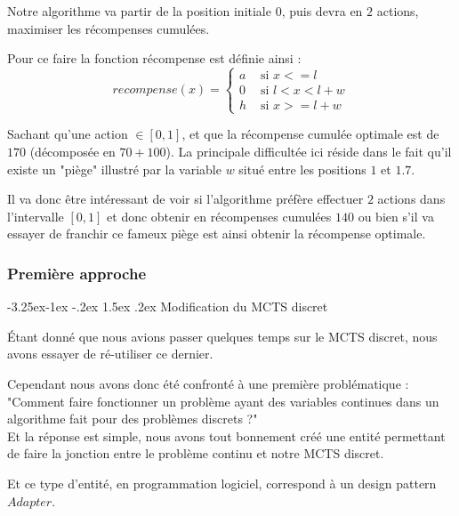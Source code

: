 \documentclass[pdftex,french, english]{article}	%
\makeatletter
\newcounter {subsubsubsection}[subsubsection]
\newcommand\subsubsubsection{\@startsection{subsubsubsection}{4}{\z@}%
                                     {-3.25ex\@plus -1ex \@minus -.2ex}%
                                     {1.5ex \@plus .2ex}%
                                     {\normalfont\normalsize\bfseries}}
\makeatother
\begin{document}
	Notre algorithme va partir de la position initiale $0$, puis devra en $2$ actions, maximiser les récompenses cumulées.

	Pour ce faire la fonction récompense est définie ainsi :
	$$recompense(x) = \left\{
	\begin{array}{ll}
 	a & \mbox{ si $x <= l$}\\
 	0 & \mbox{ si $l < x < l + w$}\\
 	h & \mbox{ si $x >= l + w$}
 	\end{array}\right.$$

	Sachant qu'une action $\in [0, 1]$, et que la récompense cumulée optimale est de $170$ (décomposée en $70 + 100$).
	La principale difficultée ici réside dans le fait qu'il existe un "piège" illustré par la variable $w$ situé entre les positions $1$ et $1.7$.

	Il va donc être intéressant de voir si l'algorithme préfère effectuer $2$ actions dans l'intervalle $[0,1]$ et donc obtenir en récompenses cumulées
	$140$ ou bien s'il va essayer de franchir ce fameux piège est ainsi obtenir la récompense optimale.

	\subsubsection{Première approche}
		\subsubsubsection{Modification du MCTS discret}

		Étant donné que nous avions passer quelques temps sur le MCTS discret, nous avons essayer de ré-utiliser ce dernier.

		Cependant nous avons donc été confronté à une première problématique : "Comment faire fonctionner un problème ayant des variables continues dans un algorithme fait pour des problèmes discrets ?" \\

		Et la réponse est simple, nous avons tout bonnement créé une entité permettant de faire la jonction entre le problème continu et notre MCTS discret. 

		Et ce type d'entité, en programmation logiciel, correspond à un design pattern $Adapter$.\\
\end{document}

